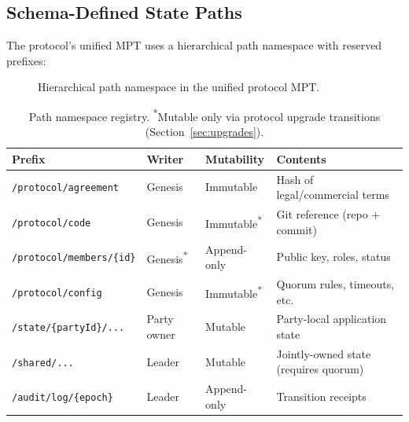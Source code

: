 \documentclass[11pt,a4paper]{article}
\begin{document}
\subsection{Schema-Defined State Paths}
\label{sec:paths}

The protocol's unified MPT uses a hierarchical path namespace with reserved
prefixes:

\begin{figure}[H]
\centering
{}
\caption{Hierarchical path namespace in the unified protocol MPT.}
\label{fig:paths}
\end{figure}

\begin{table}[H]
\centering
\begin{tabularx}{\textwidth}{lllX}
\toprule
\textbf{Prefix} & \textbf{Writer} & \textbf{Mutability} & \textbf{Contents} \\
\midrule
\texttt{/protocol/agreement} & Genesis & Immutable & Hash of legal/commercial terms \\
\texttt{/protocol/code} & Genesis & Immutable\textsuperscript{*} & Git reference (repo + commit) \\
\texttt{/protocol/members/\{id\}} & Genesis\textsuperscript{*} & Append-only & Public key, roles, status \\
\texttt{/protocol/config} & Genesis & Immutable\textsuperscript{*} & Quorum rules, timeouts, etc. \\
\texttt{/state/\{partyId\}/...} & Party owner & Mutable & Party-local application state \\
\texttt{/shared/...} & Leader & Mutable & Jointly-owned state (requires quorum) \\
\texttt{/audit/log/\{epoch\}} & Leader & Append-only & Transition receipts \\
\bottomrule
\end{tabularx}
\caption{Path namespace registry. \textsuperscript{*}Mutable only via
protocol upgrade transitions (Section~\ref{sec:upgrades}).}
\label{tab:paths}
\end{table}
\end{document}
